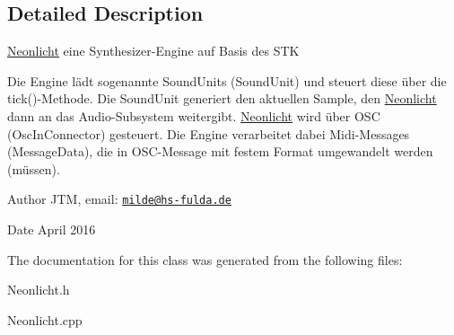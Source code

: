 \subsection{Detailed Description}
\hyperlink{classNeonlicht}{Neonlicht} eine Synthesizer-\/\+Engine auf Basis des S\+TK

Die Engine lädt sogenannte Sound\+Units (Sound\+Unit) und steuert diese über die tick()-\/\+Methode. Die Sound\+Unit generiert den aktuellen Sample, den \hyperlink{classNeonlicht}{Neonlicht} dann an das Audio-\/\+Subsystem weitergibt. \hyperlink{classNeonlicht}{Neonlicht} wird über O\+SC (Osc\+In\+Connector) gesteuert. Die Engine verarbeitet dabei Midi-\/\+Messages (Message\+Data), die in O\+S\+C-\/\+Message mit festem Format umgewandelt werden (müssen).

\begin{DoxyAuthor}{Author}
J\+TM,  email\+: \href{mailto:milde@hs-fulda.de}{\tt milde@hs-\/fulda.\+de} 
\end{DoxyAuthor}
\begin{DoxyDate}{Date}
April 2016 
\end{DoxyDate}


The documentation for this class was generated from the following files\+:\begin{DoxyCompactItemize}
\item 
Neonlicht.\+h\item 
Neonlicht.\+cpp\end{DoxyCompactItemize}
